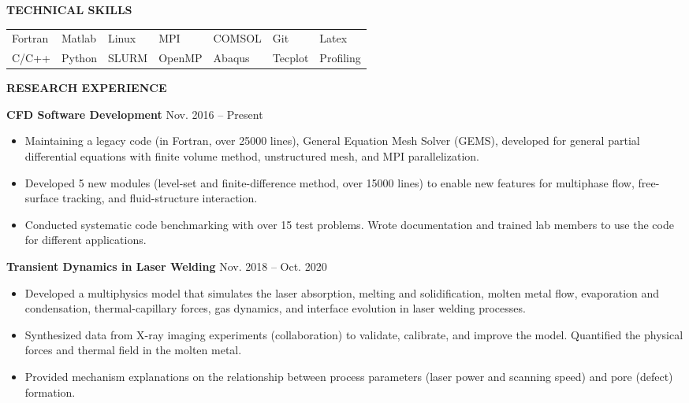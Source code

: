 \documentclass[11pt, letterpaper]{article}
\begin{document}
\textbf{TECHNICAL SKILLS}

\fullrule

\begin{tabular}{@{} l l l l l l l @{}}
   Fortran & Matlab & Linux & MPI & COMSOL & Git & Latex \\
   C/C++ & Python & SLURM & OpenMP & Abaqus & Tecplot & Profiling
\end{tabular}

\vspace{9pt}

\textbf{RESEARCH EXPERIENCE}

\fullrule

\textbf{CFD Software Development} \hfill Nov. 2016 -- Present
\begin{itemize}[leftmargin=*, labelsep=5mm]
   \item Maintaining a legacy code (in Fortran, over 25000 lines), General Equation Mesh Solver
      (GEMS), developed for general partial differential equations with finite volume method,
      unstructured mesh, and MPI parallelization.
   \item Developed 5 new modules (level-set and finite-difference method, over 15000 lines) to
      enable new features for multiphase flow, free-surface tracking, and fluid-structure
      interaction.
   \item Conducted systematic code benchmarking with over 15 test problems. Wrote documentation and
      trained lab members to use the code for different applications.
\end{itemize}

\vspace{3pt}

\textbf{Transient Dynamics in Laser Welding} \hfill Nov. 2018 -- Oct. 2020
\begin{itemize}[leftmargin=*, labelsep=5mm]
   \item Developed a multiphysics model that simulates the laser absorption, melting and
      solidification, molten metal flow, evaporation and condensation, thermal-capillary forces, gas
      dynamics, and interface evolution in laser welding processes.
   \item Synthesized data from X-ray imaging experiments (collaboration) to validate, calibrate, and
      improve the model. Quantified the physical forces and thermal field in the molten metal.
   \item Provided mechanism explanations on the relationship between process parameters (laser power
      and scanning speed) and pore (defect) formation.
\end{itemize}
\end{document}
